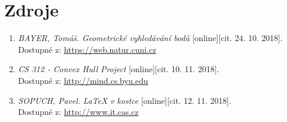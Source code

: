 \documentclass[a4paper, 12pt]{article}
\begin{document}
\section{Zdroje}
\begin{enumerate}
\item  \textsl{BAYER, Tomáš. Geometrické vyhledávání bodů} [online][cit. 24. 10. 2018].\\
Dostupné z: \href{https://web.natur.cuni.cz/~bayertom/images/courses/Adk/adk4.pdf}{https://web.natur.cuni.cz}

\item  \textsl{CS 312 - Convex Hull Project} [online][cit. 10. 11. 2018].\\
Dostupné z: \href{http://mind.cs.byu.edu/courses/312/projects/project2_files/ConvexHull_python.php}{http://mind.cs.byu.edu}

\item  \textsl{SOPUCH, Pavel. LaTeX v kostce} [online][cit. 12. 11. 2018].\\
Dostupné z: \href{http://www.it.cas.cz/manual/latex/}{http://www.it.cas.cz}


\end{enumerate}
\end{document}
